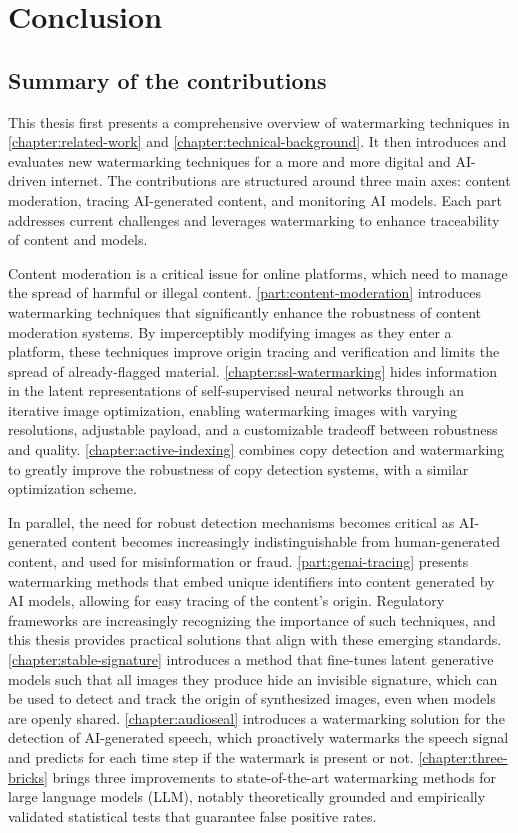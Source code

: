 
\chapter{Conclusion}\label{chapter:conclusion}



\section{Summary of the contributions}

This thesis first presents a comprehensive overview of watermarking techniques in \autoref{chapter:related-work} and \autoref{chapter:technical-background}.
It then introduces and evaluates new watermarking techniques for a more and more digital and AI-driven internet.
The contributions are structured around three main axes: content moderation, tracing AI-generated content, and monitoring AI models.
Each part addresses current challenges and leverages watermarking to enhance traceability of content and models.

Content moderation is a critical issue for online platforms, which need to manage the spread of harmful or illegal content.
\autoref{part:content-moderation} introduces watermarking techniques that significantly enhance the robustness of content moderation systems. 
By imperceptibly modifying images as they enter a platform, these techniques improve origin tracing and verification and limits the spread of already-flagged material.
\autoref{chapter:ssl-watermarking} hides information in the latent representations of self-supervised neural networks through an iterative image optimization, enabling watermarking images with varying resolutions, adjustable payload, and a customizable tradeoff between robustness and quality. 
\autoref{chapter:active-indexing} combines copy detection and watermarking to greatly improve the robustness of copy detection systems, with a similar optimization scheme.

In parallel, the need for robust detection mechanisms becomes critical as AI-generated content becomes increasingly indistinguishable from human-generated content, and used for misinformation or fraud. 
\autoref{part:genai-tracing} presents watermarking methods that embed unique identifiers into content generated by AI models, allowing for easy tracing of the content's origin. 
Regulatory frameworks are increasingly recognizing the importance of such techniques, and this thesis provides practical solutions that align with these emerging standards.
\autoref{chapter:stable-signature} introduces a method that fine-tunes latent generative models such that all images they produce hide an invisible signature, which can be used to detect and track the origin of synthesized images, even when models are openly shared.
\autoref{chapter:audioseal} introduces a watermarking solution for the detection of AI-generated speech, which proactively watermarks the speech signal and predicts for each time step if the watermark is present or not.
\autoref{chapter:three-bricks} brings three improvements to state-of-the-art watermarking methods for large language models (LLM), notably theoretically grounded and empirically validated statistical tests that guarantee false positive rates.

